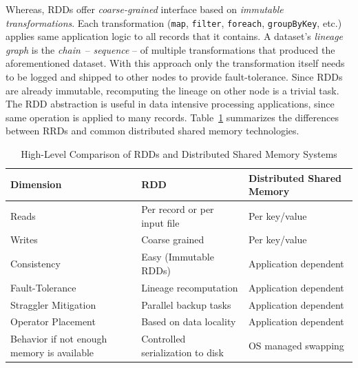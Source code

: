 Whereas, RDDs offer \emph{coarse-grained} interface based on \emph{immutable transformations}. Each transformation (\lstinline$map$, \lstinline$filter$, \lstinline$foreach$, \lstinline$groupByKey$, etc.) applies same application logic to all records that it contains. A dataset's \emph{lineage graph} is the \emph{chain}~-- \emph{sequence} -- of multiple transformations that produced the aforementioned dataset. With this approach only the transformation itself needs to be logged and shipped to other nodes to provide fault-tolerance. Since RDDs are already immutable, recomputing the lineage on other node is a trivial task. The RDD abstraction is useful in data intensive processing applications, since same operation is applied to many records. Table~\ref{tab:rdd-vs-dsm} summarizes the differences between RRDs and common distributed shared memory technologies.
\begin{table}[!h]
    \begin{tabular}{lll}
        \toprule
        \textbf{Dimension} & \textbf{RDD} & \textbf{Distributed Shared Memory}\\
        \midrule
        Reads & Per record or per input file & Per key/value \\
        Writes & Coarse grained & Per key/value \\
        Consistency & Easy (Immutable RDDs) & Application dependent \\
        Fault-Tolerance & Lineage recomputation & Application dependent \\
        Straggler Mitigation & Parallel backup tasks & Application dependent \\
        Operator Placement & Based on data locality & Application dependent \\
        Behavior if not enough memory is available & Controlled serialization to disk & OS managed swapping\\
        \bottomrule
    \end{tabular}
    \centering
    \caption[High-Level Comparison of RDDs and Distributed Shared Memory Systems]{High-Level Comparison of RDDs and Distributed Shared Memory Systems\footnotemark}
    \label{tab:rdd-vs-dsm}
\end{table}

